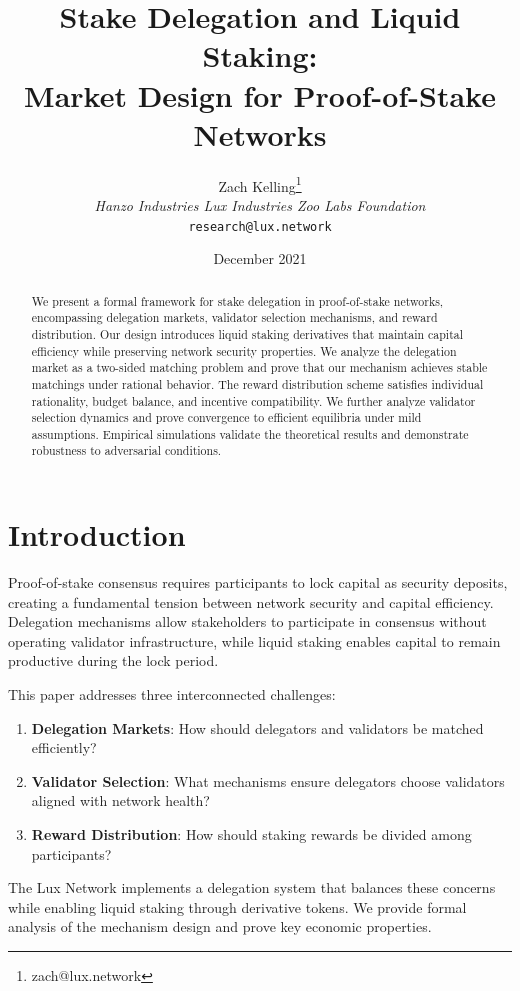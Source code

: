 \documentclass[11pt,a4paper]{article}
\title{Stake Delegation and Liquid Staking:\\Market Design for Proof-of-Stake Networks}
\author{Zach Kelling\thanks{zach@lux.network} \\ \textit{Hanzo Industries \quad Lux Industries \quad Zoo Labs Foundation} \\ \texttt{research@lux.network}}
\date{December 2021}
\theoremstyle{definition}
\theoremstyle{remark}
\begin{document}
\maketitle

\begin{abstract}
We present a formal framework for stake delegation in proof-of-stake networks, encompassing delegation markets, validator selection mechanisms, and reward distribution. Our design introduces liquid staking derivatives that maintain capital efficiency while preserving network security properties. We analyze the delegation market as a two-sided matching problem and prove that our mechanism achieves stable matchings under rational behavior. The reward distribution scheme satisfies individual rationality, budget balance, and incentive compatibility. We further analyze validator selection dynamics and prove convergence to efficient equilibria under mild assumptions. Empirical simulations validate the theoretical results and demonstrate robustness to adversarial conditions.
\end{abstract}

\section{Introduction}

Proof-of-stake consensus requires participants to lock capital as security deposits, creating a fundamental tension between network security and capital efficiency. Delegation mechanisms allow stakeholders to participate in consensus without operating validator infrastructure, while liquid staking enables capital to remain productive during the lock period.

This paper addresses three interconnected challenges:

\begin{enumerate}[label=(\roman*)]
    \item \textbf{Delegation Markets}: How should delegators and validators be matched efficiently?
    \item \textbf{Validator Selection}: What mechanisms ensure delegators choose validators aligned with network health?
    \item \textbf{Reward Distribution}: How should staking rewards be divided among participants?
\end{enumerate}

The Lux Network implements a delegation system that balances these concerns while enabling liquid staking through derivative tokens. We provide formal analysis of the mechanism design and prove key economic properties.
\end{document}
